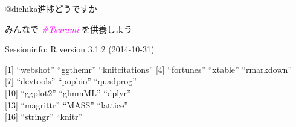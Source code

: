 \documentclass[ignorenonframetext,]{beamer}
\begin{document}
\begin{frame}

\center{
  \Huge{\textbf{\textcolor{magenta}{\faUser 自分のため、\\\faGroup 仲間のため、\\\faGlobe 誰かのため}}}
}


\end{frame}

\begin{frame}{@dichika進捗どうですか\faEyeOpen}


\end{frame}

\begin{frame}{\Large{みんなで \textit{\textcolor{magenta}{\#Tsurami}} を供養しよう}}


\end{frame}

\begin{frame}{\small{Sessioninfo: R version 3.1.2 (2014-10-31)}}

{[}1{]} ``webshot'' ``ggthemr'' ``knitcitations'' {[}4{]} ``fortunes''
``xtable'' ``rmarkdown''\\ {[}7{]} ``devtools'' ``popbio''
``quadprog''\\{[}10{]} ``ggplot2'' ``glmmML'' ``dplyr''\\{[}13{]}
``magrittr'' ``MASS'' ``lattice''\\{[}16{]} ``stringr'' ``knitr''

\flushright{\textit{\textcolor{magenta}{Questions?}} \faComments}

\end{frame}
\end{document}
